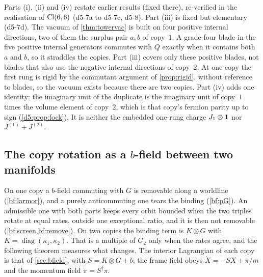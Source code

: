 Parts (i), (ii) and (iv) restate earlier results (fixed there), re-verified in the realisation of $\mathrm{Cl}(6,6)$ (d5-7a to d5-7c, d5-8).
Part (iii) is fixed but elementary (d5-7d). The vacuum of \cref{thm:towervac} is built on four positive internal directions, two of them the surplus pair $a,b$ of copy~$1$. A
grade-four blade in the five positive internal generators commutes with $Q$ exactly when it contains both $a$ and $b$, so it straddles the copies.
Part (iii) covers only these positive blades, not blades that also use the negative internal directions of copy~$2$. At one copy the first rung is
rigid by the commutant argument of \cref{prop:rigid}, without reference to blades, so the vacuum exists because there are two copies. Part (iv) adds one
identity: the imaginary unit of the duplicate is the imaginary unit of copy~$1$ times the volume element of copy~$2$, which is that copy's
fermion parity up to sign (\cref{d5:prop:fock}). It is neither the embedded one-rung charge $J_1\otimes\mathbf 1$ nor $J^{(1)}+J^{(2)}$.

\subsection{\texorpdfstring{The copy rotation as a $b$-field between two manifolds}{The copy rotation as a b-field between two manifolds}}
\label{d5:sec:bfield}

On one copy a $b$-field commuting with $G$ is removable along a worldline (\cref{bf:larmor}), and a purely anticommuting one tears
the binding (\cref{bf:pG}). An admissible one with both parts keeps every orbit bounded when the two triples rotate at equal rates,
outside one exceptional ratio, and it is then not removable (\cref{bf:screen,bf:remove}). On two copies the binding term is $K\otimes G$ with $K=\operatorname{diag}(\kappa_1,\kappa_2)$. That is a
multiple of $G_2$ only when the rates agree, and the following theorem measures what changes. The interior Lagrangian of each copy is that
of \cref{sec:bfield}, with $S=K\otimes G+b$; the frame field obeys $\dot X=-SX+\pi/m$ and the momentum field $\dot\pi=S^\dagger\pi$.


